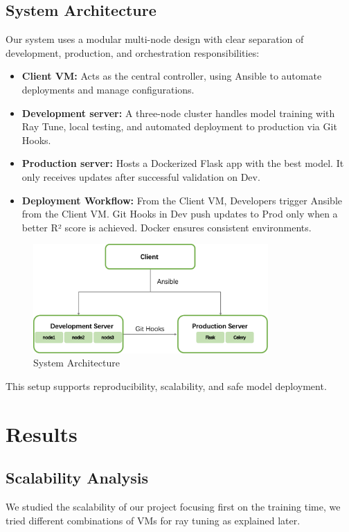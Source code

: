 \documentclass[12pt,a4paper]{article}
\begin{document}
\subsection{System Architecture}
Our system uses a modular multi-node design with clear separation of development, production, and orchestration responsibilities:
\begin{itemize}
    \item \textbf{Client VM:} Acts as the central controller, using Ansible to automate deployments and manage configurations.
    \item \textbf{Development server:} A three-node cluster handles model training with Ray Tune, local testing, and automated deployment to production via Git Hooks.
    \item \textbf{Production server:} Hosts a Dockerized Flask app with the best model. It only receives updates after successful validation on Dev.
    \item \textbf{Deployment Workflow:} From the Client VM,  Developers trigger Ansible from the Client VM. Git Hooks in Dev push updates to Prod only when a better R² score is achieved. Docker ensures consistent environments.
\end{itemize}
\begin{figure}[H]
  \centering
  \includegraphics[width=0.8\textwidth]{System.png}
  \caption{System Architecture}
  \label{fig:my-image}
\end{figure}
This setup supports reproducibility, scalability, and safe model deployment.

\section{Results}
\subsection{Scalability Analysis}
We studied the scalability of our project focusing first on the training time, we tried different combinations of VMs for ray tuning as explained later.
\end{document}
